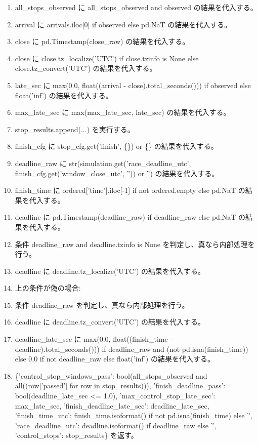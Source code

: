 \documentclass[a4paper,11pt]{article}
\begin{document}
\begin{enumerate}[leftmargin=1.8em]
\item   all\_stops\_observed に all\_stops\_observed and observed の結果を代入する。
\item   arrival に arrivals.iloc[0] if observed else pd.NaT の結果を代入する。
\item   close に pd.Timestamp(close\_raw) の結果を代入する。
\item   close に close.tz\_localize('UTC') if close.tzinfo is None else close.tz\_convert('UTC') の結果を代入する。
\item   late\_sec に max(0.0, float((arrival - close).total\_seconds())) if observed else float('inf') の結果を代入する。
\item   max\_late\_sec に max(max\_late\_sec, late\_sec) の結果を代入する。
\item   stop\_results.append(...) を実行する。
\item finish\_cfg に stop\_cfg.get('finish', \{\}) or \{\} の結果を代入する。
\item deadline\_raw に str(simulation.get('race\_deadline\_utc', finish\_cfg.get('window\_close\_utc', '')) or '') の結果を代入する。
\item finish\_time に ordered['time'].iloc[-1] if not ordered.empty else pd.NaT の結果を代入する。
\item deadline に pd.Timestamp(deadline\_raw) if deadline\_raw else pd.NaT の結果を代入する。
\item 条件 deadline\_raw and deadline.tzinfo is None を判定し、真なら内部処理を行う。
\item   deadline に deadline.tz\_localize('UTC') の結果を代入する。
\item   上の条件が偽の場合:
\item   条件 deadline\_raw を判定し、真なら内部処理を行う。
\item     deadline に deadline.tz\_convert('UTC') の結果を代入する。
\item deadline\_late\_sec に max(0.0, float((finish\_time - deadline).total\_seconds())) if deadline\_raw and (not pd.isna(finish\_time)) else 0.0 if not deadline\_raw else float('inf') の結果を代入する。
\item \{'control\_stop\_windows\_pass': bool(all\_stops\_observed and all((row['passed'] for row in stop\_results))), 'finish\_deadline\_pass': bool(deadline\_late\_sec <= 1.0), 'max\_control\_stop\_late\_sec': max\_late\_sec, 'finish\_deadline\_late\_sec': deadline\_late\_sec, 'finish\_time\_utc': finish\_time.isoformat() if not pd.isna(finish\_time) else '', 'race\_deadline\_utc': deadline.isoformat() if deadline\_raw else '', 'control\_stops': stop\_results\} を返す。
            \end{enumerate}
\end{document}
